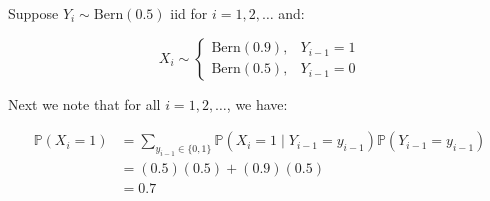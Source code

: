\begin{example}
Suppose $Y_i \sim \text{Bern}(0.5)$ iid for $i=1,2,\dots$ and:

\begin{equation}
X_i \sim
\begin{cases}
      \text{Bern}(0.9), & Y_{i-1} = 1 \\
      \text{Bern}(0.5), & Y_{i-1} = 0
\end{cases}
\end{equation}

\noindent Next we note that for all $i=1,2, \dots$, we have:

\begin{equation}
\begin{aligned}
\mathbb{P}(X_i = 1)
&= \sum_{y_{i-1}\in \{0,1\}}
    \mathbb{P}(X_i =1 \mid Y_{i-1} = y_{i-1}) \mathbb{P}(Y_{i-1} = y_{i-1}) \\
&= (0.5)(0.5) + (0.9)(0.5) \\
&= 0.7
\end{aligned}
\end{equation}

\begin{comment}
\noindent This process can be equivalently characterized by the four-state ``complete'' Markov Chain with states $(X,Y) \in \{0,1\}^2$ and transition matrix:

\begin{equation}
M^{(c)} =
\begin{blockarray}{ccccc}
(0,0) & (0,1) & (1,0) & (1,1) \\
\begin{block}{(cccc)c}
    0.25 & 0.1 & 0.25 & 0.1 & (0,0) \\
    0.25 & 0.9 & 0.25 & 0.9 & (0,1) \\
    0.25 & 0.1 & 0.25 & 0.1 & (1,0) \\
    0.25 & 0.9 & 0.25 & 0.9 & (1,1) \\
\end{block}
\end{blockarray}
\end{equation}

\noindent where $M^{(c)}_{kj}$ represents the probability of having $(X_i,Y_i)$ in state $k$ given that $(X_{i-1},Y_{i-1})$ is in state $j$. We can additionally define a two-state ``restricted'' Markov Chain with states $X \in \{0,1\}$ and transition matrix:

\begin{equation}
M^{(r)} =
\begin{blockarray}{ccc}
0 & 1 \\
\begin{block}{(cc)c}
    0.3 & 0.3 & 0 \\
    0.7 & 0.7 & 1 \\
\end{block}
\end{blockarray}
\end{equation}
\end{comment}



\end{example}
